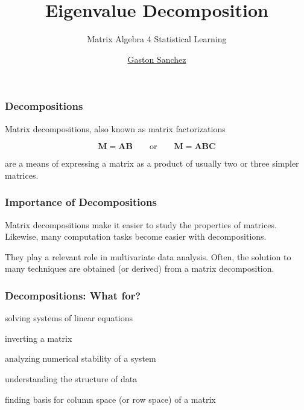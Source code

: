 \documentclass[12pt]{beamer}\usepackage[]{graphicx}\usepackage[]{color}
\title{Eigenvalue Decomposition}
\subtitle{Matrix Algebra 4 Statistical Learning}
\author{\href{http://www.gastonsanchez.com}{Gaston Sanchez}}
\institute{\href{https://creativecommons.org/licenses/by-sa/4.0/}{\tt \scriptsize \color{foreground} CC BY-SA 4.0}}
\date{}
\begin{document}
{
  \frame{\titlepage} 
}


\begin{frame}
\begin{center}
\Huge{}
\end{center}
\end{frame}


\begin{frame}[fragile]
\frametitle{Decompositions}

Matrix decompositions, also known as matrix factorizations

{\Large
$$
\mathbf{M = A B} \qquad \text{or} \qquad \mathbf{M = A B C}
$$
}

are a means of expressing a matrix as a product 
of usually two or three {\hilit simpler} matrices.

\end{frame}


\begin{frame}
\frametitle{Importance of Decompositions}

Matrix decompositions make it easier to study the properties of matrices. Likewise, many computation tasks become easier with decompositions.

\bigskip
They play a relevant role in multivariate data analysis. Often, the solution
to many techniques are obtained (or derived) from a matrix decomposition. 
\eb

\end{frame}


\begin{frame}
\frametitle{Decompositions: What for?}

\bbi
  \item solving systems of linear equations
  \item inverting a matrix
  \item analyzing numerical stability of a system
  \item understanding the structure of data
  \item finding basis for column space (or row space) of a matrix
\ei

\end{frame}
\end{document}
